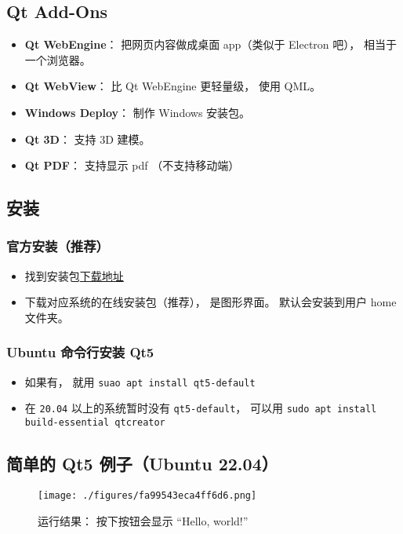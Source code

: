 \subsection{Qt Add-Ons}
\begin{itemize}
\item \textbf{Qt WebEngine}： 把网页内容做成桌面 app（类似于 Electron 吧）， 相当于一个浏览器。
\item \textbf{Qt WebView}： 比 Qt WebEngine 更轻量级， 使用 QML。
\item \textbf{Windows Deploy}： 制作 Windows 安装包。
\item \textbf{Qt 3D}： 支持 3D 建模。
\item \textbf{Qt PDF}： 支持显示 pdf （不支持移动端）
\end{itemize}


\subsection{安装}
\subsubsection{官方安装（推荐）}
\begin{itemize}
\item 找到安装包\href{https://www.qt.io/download-qt-installer}{下载地址}
\item 下载对应系统的在线安装包（推荐）， 是图形界面。 默认会安装到用户 home 文件夹。
\end{itemize}

\subsubsection{Ubuntu 命令行安装 Qt5}
\begin{itemize}
\item 如果有， 就用 \verb|suao apt install qt5-default|
\item 在 \verb|20.04| 以上的系统暂时没有 \verb|qt5-default|， 可以用 \verb|sudo apt install build-essential qtcreator|
\end{itemize}


\subsection{简单的 Qt5 例子（Ubuntu 22.04）}
\begin{figure}[ht]
\centering
\texttt{[image: ./figures/fa99543eca4ff6d6.png]}
\caption{运行结果： 按下按钮会显示 “Hello, world!”} \label{fig_QtInt1}
\end{figure}

